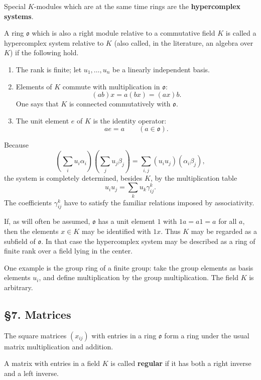 \documentclass[
  11pt,
]{article}
\begin{document}
Special \(K\)-modules which are at the same time rings are the
\textbf{hypercomplex systems}.

A ring \(\mathfrak{o}\) which is also a right module relative to a
commutative field \(K\) is called a hypercomplex system relative to
\(K\) (also called, in the literature, an algebra over \(K\)) if the
following hold.

\begin{enumerate}
\def\labelenumi{\arabic{enumi}.}
\item
  The rank is finite; let \(u_1,\ldots,u_n\) be a linearly independent
  basis.
\item
  Elements of \(K\) commute with multiplication in \(\mathfrak{o}\): \[
    (ab)x=a(bx)=(ax)b.
  \] One says that \(K\) is connected commutatively with
  \(\mathfrak{o}\).
\item
  The unit element \(e\) of \(K\) is the identity operator: \[
    ae=a \qquad (a\in\mathfrak{o}).
  \]
\end{enumerate}

Because \[
  \left(\sum_i u_i\alpha_i\right)
  \left(\sum_j u_j\beta_j\right)
  =\sum_{i,j} (u_i u_j)(\alpha_i\beta_j),
\] the system is completely determined, besides \(K\), by the
multiplication table \[
  u_i u_j=\sum_k u_k\gamma_{ij}^{k}.
\] The coefficients \(\gamma_{ij}^{k}\) have to satisfy the familiar
relations imposed by associativity.

If, as will often be assumed, \(\mathfrak{o}\) has a unit element \(1\)
with \(1a=a1=a\) for all \(a\), then the elements \(x\in K\) may be
identified with \(1x\). Thus \(K\) may be regarded as a subfield of
\(\mathfrak{o}\). In that case the hypercomplex system may be described
as a ring of finite rank over a field lying in the center.

One example is the group ring of a finite group: take the group elements
as basis elements \(u_i\), and define multiplication by the group
multiplication. The field \(K\) is arbitrary.

\subsection{§7. Matrices}\label{matrices}

The square matrices \((x_{ij})\) with entries in a ring \(\mathfrak{o}\)
form a ring under the usual matrix multiplication and addition.

A matrix with entries in a field \(K\) is called \textbf{regular} if it
has both a right inverse and a left inverse.
\end{document}
